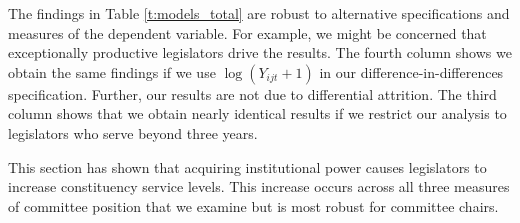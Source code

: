 \documentclass[12pt]{article}
\begin{document}
The findings in Table \ref{t:models_total} are robust to alternative specifications and measures of the dependent variable. For example, we might be concerned that exceptionally productive legislators drive the results. The fourth column shows we obtain the same findings if we use $\log (Y_{ijt} + 1)$ in our difference-in-differences specification. Further, our results are not due to differential attrition. The third column shows that we obtain nearly identical results if we restrict our analysis to legislators who serve beyond three years.    

This section has shown that acquiring institutional power causes legislators to increase constituency service levels. This increase occurs across all three measures of committee position that we examine but is most robust for committee chairs. 




\end{document}
